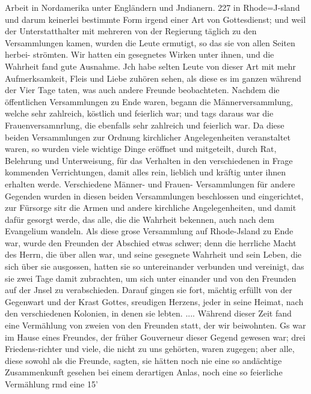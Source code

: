 Arbeit in Nordamerika unter Engländern und Jndianern. 227
in Rhode=J-sland und darum keinerlei bestimmte Form irgend
einer Art von Gottesdienst; und weil der Unterstatthalter mit
mehreren von der Regierung täglich zu den Versammlungen kamen,
wurden die Leute ermutigt, so das sie von allen Seiten herbei-
strömten. Wir hatten ein gesegnetes Wirken unter ihnen, und
die Wahrheit fand gute Ausnahme. Jch habe selten Leute von
dieser Art mit mehr Aufmerksamkeit, Fleis und Liebe zuhören
sehen, als diese es im ganzen während der Vier Tage taten, was
auch andere Freunde beobachteten. Nachdem die öffentlichen
Versammlungen zu Ende waren, begann die Männerversammlung,
welche sehr zahlreich, köstlich und feierlich war; und tags daraus
war die Frauenversamnrlung, die ebenfalls sehr zahlreich und
feierlich war. Da diese beiden Versammlungen zur Ordnung
kirchlicher Angelegenheiten veranstaltet waren, so wurden viele
wichtige Dinge eröffnet und mitgeteilt, durch Rat, Belehrung und
Unterweisung, für das Verhalten in den verschiedenen in Frage
kommenden Verrichtungen, damit alles rein, lieblich und kräftig
unter ihnen erhalten werde. Verschiedene Männer- und Frauen-
Versammlungen für andere Gegenden wurden in diesen beiden
Versammlungen beschlossen und eingerichtet, zur Fürsorge sitr die
Armen und andere kirchliche Angelegenheiten, und damit dafür
gesorgt werde, das alle, die die Wahrheit bekennen, auch nach
dem Evangelium wandeln. Als diese grose Versammlung auf
Rhode-Jsland zu Ende war, wurde den Freunden der Abschied
etwas schwer; denn die herrliche Macht des Herrn, die über allen
war, und seine gesegnete Wahrheit und sein Leben, die sich über sie
ausgossen, hatten sie so untereinander verbunden und vereinigt,
das sie zwei Tage damit zubrachten, um sich unter einander und
von den Freunden auf der Jnsel zu verabschieden. Darauf gingen
sie fort, mächtig erfüllt von der Gegenwart und der Krast Gottes,
sreudigen Herzens, jeder in seine Heimat, nach den verschiedenen
Kolonien, in denen sie lebten. ....
Während dieser Zeit fand eine Vermählung von zweien von
den Freunden statt, der wir beiwohnten. Gs war im Hause
eines Freundes, der früher Gouverneur dieser Gegend gewesen war;
drei Friedens-richter und viele, die nicht zu uns gehörten, waren
zugegen; aber alle, diese sowohl als die Freunde, sagten, sie hätten
noch nie eine so andächtige Zusammenkunft gesehen bei einem
derartigen Anlas, noch eine so feierliche Vermählung rmd eine
15’


